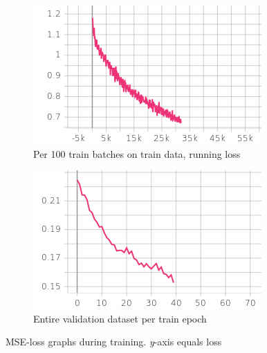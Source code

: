 \documentclass{article}
\begin{document}
        \begin{figure}
            \label{fig:loss}
            \begin{subfigure}[b]{0.5\textwidth}
                \centering
                \includegraphics[width=\textwidth]{img/train_loss.png}
                \caption{Per 100 train batches on train data, running loss}
                \label{fig:train_loss}
            \end{subfigure}
            \hfill 
            \begin{subfigure}[b]{0.45\textwidth}
                \centering
                \includegraphics[width=\textwidth]{img/val_loss.png}
                \caption{Entire validation dataset per train epoch}
                \label{fig:val_loss}
            \end{subfigure}
            \caption{MSE-loss graphs during training. \textit{y}-axis equals loss}
        \end{figure}
        
\end{document}
